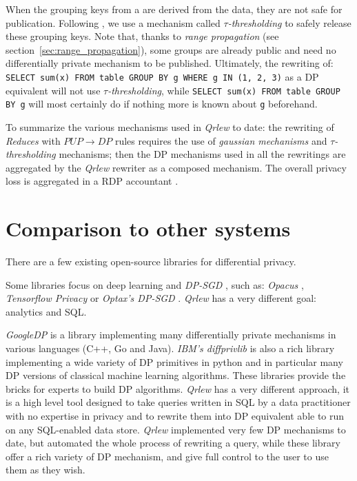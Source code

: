 \documentclass{article}
\newcommand{\qrlew}{\emph{Qrlew}}
\begin{document}
    When the grouping keys from a are derived from the data, they are not safe for publication.
    Following \cite{korolova2009releasing, wilson2019differentially}, we use a mechanism called \emph{$\tau$-thresholding} to safely release these grouping keys.
    Note that, thanks to \emph{range propagation} (see section~\ref{sec:range_propagation}), some groups are already public and need no differentially private mechanism to be published.
    Ultimately, the rewriting of: \texttt{SELECT sum(x) FROM table GROUP BY g WHERE g IN (1, 2, 3)} as a DP equivalent will not use \emph{$\tau$-thresholding}, while \texttt{SELECT sum(x) FROM table GROUP BY g} will most certainly do if nothing more is known about \texttt{g} beforehand.
    
    To summarize the various mechanisms used in \qrlew{} to date:
    the rewriting of \emph{Reduces} with $PUP \rightarrow DP$ rules requires the use of \emph{gaussian mechanisms} and \emph{$\tau$-thresholding} mechanisms;
    then the DP mechanisms used in all the rewritings are aggregated by the \qrlew{} rewriter as a composed mechanism.
    The overall privacy loss is aggregated in a RDP accountant \cite{mironov2017renyi}.
    
    \section{Comparison to other systems}
    
    There are a few existing open-source libraries for differential privacy.
    
    Some libraries focus on deep learning and \emph{DP-SGD} \cite{abadi2016deep}, such as: \emph{Opacus} \cite{yousefpour2021opacus}, \emph{Tensorflow Privacy} \cite{TensorFlowPrivacy} or \emph{Optax's DP-SGD} \cite{deepmind2020jax}. \qrlew{} has a very different goal: analytics and SQL.
    
    \emph{GoogleDP} \cite{GoogleDP} is a library implementing many differentially private mechanisms in various languages (C++, Go and Java).
    \emph{IBM's diffprivlib} \cite{diffprivlib} is also a rich library implementing a wide variety of DP primitives in python and in particular many DP versions of classical machine learning algorithms. 
    These libraries provide the bricks for experts to build DP algorithms. \qrlew{} has a very different approach, it is a high level tool designed to take queries written in SQL by a data practitioner with no expertise in privacy and to rewrite them into DP equivalent able to run on any SQL-enabled data store. \qrlew{} implemented very few DP mechanisms to date, but automated the whole process of rewriting a query, while these library offer a rich variety of DP mechanism, and give full control to the user to use them as they wish.
    
\end{document}
